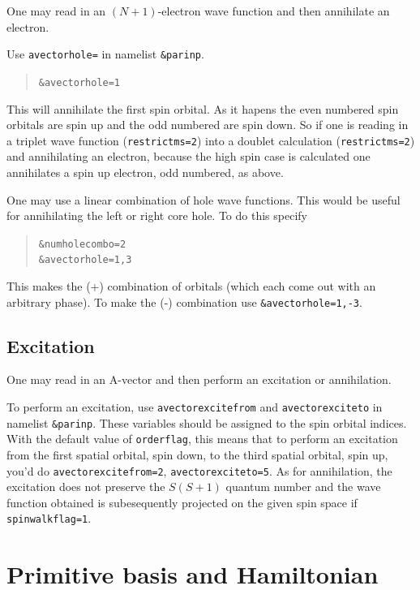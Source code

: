 \documentclass[10pt,leqno, oneside]{book}
\begin{document}
One may read in an $(N+1)$-electron wave function and then annihilate an electron.  

Use \verb#avectorhole=# in namelist \verb#&parinp#.
\begin{quote}
{\footnotesize 
\verb#&avectorhole=1# }
\end{quote}
This will annihilate the first spin orbital.  As it hapens the even numbered spin orbitals are spin up and the odd numbered are spin down.  So if one is
reading in a triplet wave function (\verb#restrictms=2#) into a doublet calculation (\verb#restrictms=2#) and annihilating an electron, because the
high spin case is calculated one annihilates a spin up electron, odd numbered, as above.

One may use a linear combination of hole wave functions.  This would be useful for annihilating the left or right core hole.  To do this specify
\begin{quote}
{\footnotesize 
\verb#&numholecombo=2# \\
\verb#&avectorhole=1,3# }
\end{quote}
This makes the (+) combination of orbitals (which each come out with an arbitrary phase).  To make the (-) combination use \verb#&avectorhole=1,-3#.

\subsection{Excitation}

One may read in an A-vector and then perform an excitation or annihilation.  

To perform an excitation, use \verb#avectorexcitefrom# and
\verb#avectorexciteto# in namelist \verb#&parinp#.  
These variables should be assigned to the spin orbital indices.  With the default value of \verb#orderflag#, this means
that to perform an excitation from the first spatial orbital, spin down, to the third spatial orbital, spin up,  you'd do \verb#avectorexcitefrom=2#, \verb#avectorexciteto=5#.  As for annihilation, the excitation does not preserve the $S(S+1)$ quantum number and the wave function obtained is
subesequently projected on the given spin space if \verb#spinwalkflag=1#.








\section{Primitive basis and Hamiltonian}
\end{document}
